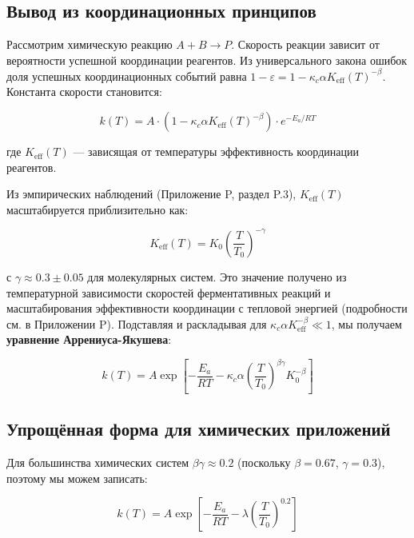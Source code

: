 \documentclass[12pt,a4paper]{article}
\theoremstyle{remark}
\newcommand{\Keff}{K_{\mathrm{eff}}}
\newcommand{\kappac}{\kappa_c}
\newcommand{\eps}{\varepsilon}
\begin{document}
	\subsection{Вывод из координационных принципов}
	
	Рассмотрим химическую реакцию $A + B \rightarrow P$. Скорость реакции зависит от вероятности успешной координации реагентов. Из универсального закона ошибок доля успешных координационных событий равна $1 - \eps = 1 - \kappac \alpha \Keff(T)^{-\beta}$. Константа скорости становится:
	
	\begin{equation}
		k(T) = A \cdot (1 - \kappac \alpha \Keff(T)^{-\beta}) \cdot e^{-E_a/RT}
		\label{eq:arrhenius-base}
	\end{equation}
	
	где $\Keff(T)$ — зависящая от температуры эффективность координации реагентов.
	
	Из эмпирических наблюдений (Приложение P, раздел P.3), $\Keff(T)$ масштабируется приблизительно как:
	
	\begin{equation}
		\Keff(T) = K_0 \left(\frac{T}{T_0}\right)^{-\gamma}
		\label{eq:K-T-scaling}
	\end{equation}
	
	с $\gamma \approx 0.3 \pm 0.05$ для молекулярных систем. Это значение получено из температурной зависимости скоростей ферментативных реакций и масштабирования эффективности координации с тепловой энергией (подробности см. в Приложении P). Подставляя и раскладывая для $\kappac \alpha \Keff^{-\beta} \ll 1$, мы получаем \textbf{уравнение Аррениуса-Якушева}:
	
	\begin{equation}
		\boxed{k(T) = A \exp\left[-\frac{E_a}{RT} - \kappac \alpha \left(\frac{T}{T_0}\right)^{\beta\gamma} K_0^{-\beta}\right]}
		\label{eq:arrhenius-yakushev}
	\end{equation}
	
	\subsection{Упрощённая форма для химических приложений}
	
	Для большинства химических систем $\beta\gamma \approx 0.2$ (поскольку $\beta = 0.67$, $\gamma = 0.3$), поэтому мы можем записать:
	
	\begin{equation}
		k(T) = A \exp\left[-\frac{E_a}{RT} - \lambda \left(\frac{T}{T_0}\right)^{0.2}\right]
		\label{eq:arrhenius-simple}
	\end{equation}
	
\end{document}
